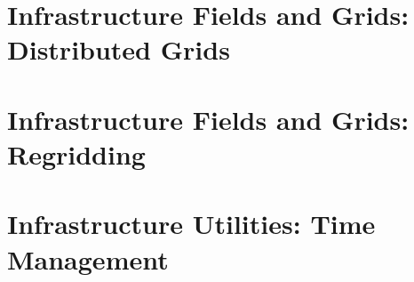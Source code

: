 \documentclass[english]{article}
\newcommand{\shortname}{GR}
\begin{document}
\part{Infrastructure Fields and Grids: Distributed Grids}
\label{part:Infrastructure_Fields_and_Grids:_Distributed_Grids}

\setcounter{section}{0}
\renewcommand{\thesection}{\shortname\arabic{section}}
\renewcommand{\thesubsection}{\shortname\arabic{section}.\arabic{subsection}}
\renewcommand{\thesubsubsection}{\shortname\arabic{section}.\arabic{subsection}.\arabic{subsubsection}}



\newpage
\begin{htmlonly}
\end{htmlonly}
\part{Infrastructure Fields and Grids: Regridding}
\label{part:Infrastructure_Fields_and_Grids:_Regridding}

\setcounter{section}{0}
\renewcommand{\thesection}{\shortname\arabic{section}}
\renewcommand{\thesubsection}{\shortname\arabic{section}.\arabic{subsection}}
\renewcommand{\thesubsubsection}{\shortname\arabic{section}.\arabic{subsection}.\arabic{subsubsection}}


\newpage
\begin{htmlonly}
\end{htmlonly}
\part{Infrastructure Utilities: Time Management}
\label{part:Infrastructure_Utilities:_Time_Management}

\setcounter{section}{0}
\renewcommand{\thesection}{\shortname\arabic{section}}
\renewcommand{\thesubsection}{\shortname\arabic{section}.\arabic{subsection}}
\renewcommand{\thesubsubsection}{\shortname\arabic{section}.\arabic{subsection}.\arabic{subsubsection}}


\newpage
\begin{htmlonly}
\end{htmlonly}
\end{document}
